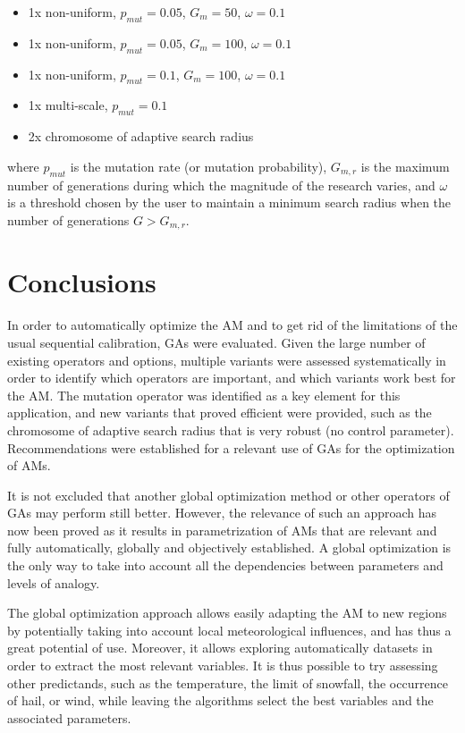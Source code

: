 \documentclass{ametsoc}
\begin{document}
\begin{itemize}
	\setlength\itemsep{-4px}
	\item 1x non-uniform, $p_{mut}=0.05$, $G_{m}=50$, $\omega=0.1$
	\item 1x non-uniform, $p_{mut}=0.05$, $G_{m}=100$, $\omega=0.1$
	\item 1x non-uniform, $p_{mut}=0.1$, $G_{m}=100$, $\omega=0.1$
	\item 1x multi-scale,  $p_{mut}=0.1$
	\item 2x chromosome of adaptive search radius
\end{itemize}

where $p_{mut}$ is the mutation rate (or mutation probability), $G_{m,r}$ is the maximum number of generations during which the magnitude of the research varies, and $\omega$ is a threshold chosen by the user to maintain a minimum search radius when the number of generations $G>G_{m,r}$.


\section{Conclusions}

In order to automatically optimize the AM and to get rid of the limitations of the usual sequential calibration, GAs were evaluated. Given the large number of existing operators and options, multiple variants were assessed systematically in order to identify which operators are important, and which variants work best for the AM. The mutation operator was identified as a key element for this application, and new variants that proved efficient were provided, such as the chromosome of adaptive search radius that is very robust (no control parameter). Recommendations were established for a relevant use of GAs for the optimization of AMs. 

It is not excluded that another global optimization method or other operators of GAs may perform still better. However, the relevance of such an approach has now been proved as it results in parametrization of AMs that are relevant and fully automatically, globally and objectively established. A global optimization is the only way to take into account all the dependencies between parameters and levels of analogy.

The global optimization approach allows easily adapting the AM to new regions by potentially taking into account local meteorological influences, and has thus a great potential of use. Moreover, it allows exploring automatically datasets in order to extract the most relevant variables. It is thus possible to try assessing other predictands, such as the temperature, the limit of snowfall, the occurrence of hail, or wind, while leaving the algorithms select the best variables and the associated parameters.
\end{document}
